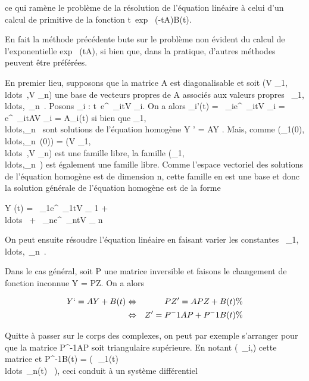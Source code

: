 \documentclass[]{article}
\begin{document}
ce qui ramène le problème de la résolution de l'équation linéaire à
celui d'un calcul de primitive de la fonction
t\mapsto~exp~ (-tA)B(t).

En fait la méthode précédente bute sur le problème non évident du calcul
de l'exponentielle exp~ (tA), si bien que, dans
la pratique, d'autres méthodes peuvent être préférées.

En premier lieu, supposons que la matrice A est diagonalisable et soit
(V
\_1,\\ldots~,V
\_n) une base de vecteurs propres de A associés aux valeurs
propres
\lambda~\_1,\\ldots,\lambda~\_n~.
Posons \Phi\_i :
t\mapsto~e^\lambda~\_itV \_i. On
a alors \Phi\_i'(t) = \lambda~\_ie^\lambda~\_itV
\_i = e^\lambda~\_itAV \_i = A\Phi\_i(t)
si bien que
\Phi\_1,\\ldots,\Phi\_n~
sont solutions de l'équation homogène Y ' = AY . Mais, comme
(\Phi\_1(0),\\ldots,\Phi\_n~(0))
= (V
\_1,\\ldots~,V
\_n) est une famille libre, la famille
(\Phi\_1,\\ldots,\Phi\_n~)
est également une famille libre. Comme l'espace vectoriel des solutions
de l'équation homogène est de dimension n, cette famille en est une base
et donc la solution générale de l'équation homogène est de la forme

Y (t) = \alpha~\_1e^\lambda~\_1tV \_ 1 +
\\ldots~ +
\alpha~\_ne^\lambda~\_ntV \_ n

On peut ensuite résoudre l'équation linéaire en faisant varier les
constantes
\alpha~\_1,\\ldots,\alpha~\_n~.

Dans le cas général, soit P une matrice inversible et faisons le
changement de fonction inconnue Y = PZ. On a alors

\begin{align*} Y `= AY + B(t)&
\Leftrightarrow & PZ' = APZ + B(t) \%&
\\ & \Leftrightarrow & Z' =
P^-1AP + P^-1B(t)\%&
\\ \end{align*}

Quitte à passer sur le corps des complexes, on peut par exemple
s'arranger pour que la matrice P^-1AP soit triangulaire
supérieure. En notant (\alpha~\_i,\jmath) cette matrice et
P^-1B(t) = \left
(\matrix\,\beta~\_1(t)\\ldots\beta~\_n(t)~\right
), ceci conduit à un système différentiel
\end{document}
